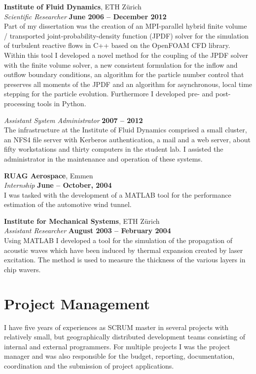 \documentclass[line,11pt,a4paper]{../resume}
\begin{document}
\begin{resume}
\textbf{Institute of Fluid Dynamics}, ETH Z\"urich \vspace{2mm}\\\vspace{1mm}%
\textsl{Scientific Researcher} \hfill \textbf{June 2006 -- December 2012}\\
Part of my dissertation was the creation of an MPI-parallel hybrid finite
volume / transported joint-probability-density function (JPDF) solver for the
simulation of turbulent reactive flows in C++ based on the OpenFOAM CFD
library. Within this tool I developed a novel method for the coupling of the
JPDF solver with the finite volume solver, a new consistent formulation for the
inflow and outflow boundary conditions, an algorithm for the particle number
control that preserves all moments of the JPDF and an algorithm for
asynchronous, local time stepping for the particle evolution. Furthermore I
developed pre- and post-processing tools in Python.

\textsl{Assistant System Administrator} \hfill \textbf{2007 -- 2012}\\
The infrastructure at the Institute of Fluid Dynamics comprised a small
cluster, an NFS4 file server with Kerberos authentication, a mail and a web
server, about fifty workstations and thirty computers in the student lab. I
assisted the administrator in the maintenance and operation of these systems.

\textbf{RUAG Aerospace}, Emmen \vspace{2mm}\\\vspace{1mm}%
\textsl{Internship} \hfill \textbf{June -- October, 2004}\\
I was tasked with the development of a MATLAB tool for the performance estimation
of the automotive wind tunnel.

\textbf{Institute for Mechanical Systems}, ETH Z\"urich \vspace{2mm}\\\vspace{1mm}%
\textsl{Assistant Researcher} \hfill \textbf{August 2003 -- February 2004}\\
Using MATLAB I developed a tool for the simulation of the propagation of
acoustic waves which have been induced by thermal expansion created by laser
excitation. The method is used to measure the thickness of the various layers
in chip wavers.

\pagebreak
\section{\mysidestyle Project Management}\vspace{2mm}
I have five years of experiences as SCRUM master in several projects with
relatively small, but geographically distributed development teams consisting
of internal and external programmers. For multiple projects I was
the project manager and was also responsible for the budget, reporting,
documentation, coordination and the submission of project applications.


\end{resume}
\end{document}
